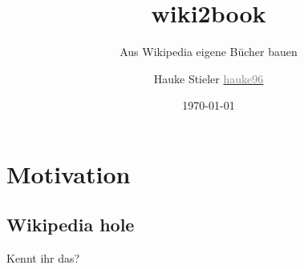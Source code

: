 \documentclass[9pt]{beamer}
\author[Hauke Stieler]{
	Hauke Stieler\n
	\href{https://github.com/hauke96}{\footnotesize\textcolor{gray}{\faicon{github} hauke96}}
}
\title{wiki2book}
\subtitle{Aus Wikipedia eigene Bücher bauen}
\date{\today}
\begin{document}
	{
		\maketitle
	}


	\section{Motivation}	
	
	\subsection{Wikipedia hole}
	
	\begin{frame}
		\begin{center}
			Kennt ihr das?
		\end{center}
	\end{frame}
\end{document}

